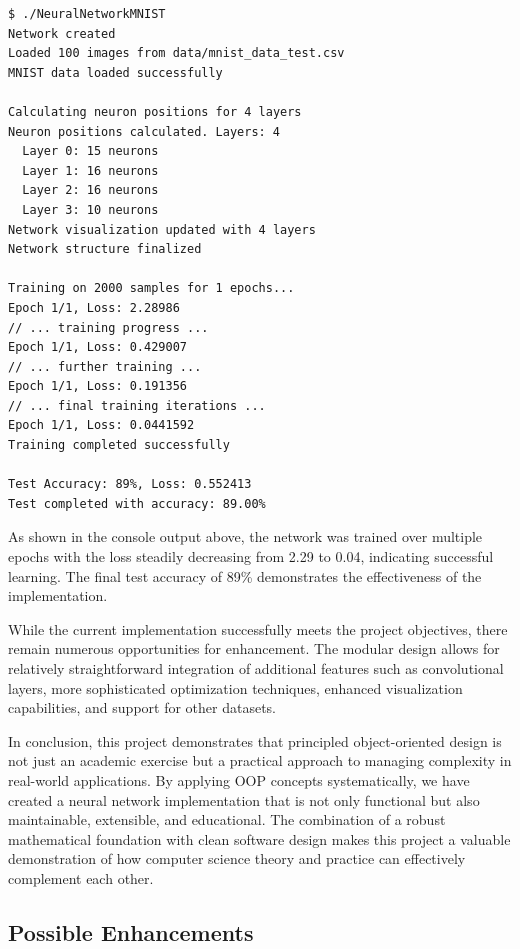 \documentclass[12pt]{article}
\begin{document}
\begin{lstlisting}[language=bash, caption=Shortened console output showing network structure and training progress]
$ ./NeuralNetworkMNIST
Network created
Loaded 100 images from data/mnist_data_test.csv
MNIST data loaded successfully

Calculating neuron positions for 4 layers
Neuron positions calculated. Layers: 4
  Layer 0: 15 neurons
  Layer 1: 16 neurons
  Layer 2: 16 neurons
  Layer 3: 10 neurons
Network visualization updated with 4 layers
Network structure finalized

Training on 2000 samples for 1 epochs...
Epoch 1/1, Loss: 2.28986
// ... training progress ...
Epoch 1/1, Loss: 0.429007
// ... further training ...
Epoch 1/1, Loss: 0.191356
// ... final training iterations ...
Epoch 1/1, Loss: 0.0441592
Training completed successfully

Test Accuracy: 89%, Loss: 0.552413
Test completed with accuracy: 89.00%
\end{lstlisting}

As shown in the console output above, the network was trained over multiple epochs with the loss steadily decreasing from 2.29 to 0.04, indicating successful learning. The final test accuracy of 89\% demonstrates the effectiveness of the implementation.

While the current implementation successfully meets the project objectives, there remain numerous opportunities for enhancement. The modular design allows for relatively straightforward integration of additional features such as convolutional layers, more sophisticated optimization techniques, enhanced visualization capabilities, and support for other datasets.\newline

In conclusion, this project demonstrates that principled object-oriented design is not just an academic exercise but a practical approach to managing complexity in real-world applications. By applying OOP concepts systematically, we have created a neural network implementation that is not only functional but also maintainable, extensible, and educational. The combination of a robust mathematical foundation with clean software design makes this project a valuable demonstration of how computer science theory and practice can effectively complement each other.

\subsection{Possible Enhancements}
\end{document}
